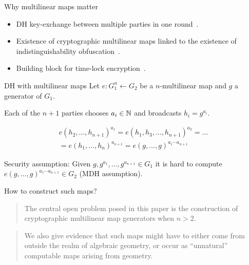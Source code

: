 \documentclass[english]{beamer}
\begin{document}
    \begin{frame}{Why multilinear maps matter}
        \begin{itemize}
            \item DH key-exchange between multiple parties in one round~\cite*{boneh2003applications}.
            \item Existence of cryptographic multilinear maps linked to the existence of indistinguishability obfuscation~\cite*{albrecht2020multilinear}.
            \item Building block for time-lock encryption~\cite*{liu2018build}.
        \end{itemize}
    \end{frame}
    \begin{frame}{DH with multilinear maps}
        Let $e: G_1^n \leftarrow G_2$ be a $n$-multilinear map and $g$ a generator of $G_1$.

        Each of the $n+1$ parties chooses $a_i \in \mathbb{N}$ and broadcasts $h_i = g^{a_i}$.

        \begin{multline*}
            e(h_2, \dots, h_{n+1})^{a_1} = e(h_1, h_3, \dots, h_{n+1})^{a_2} = \dots \\
            = e(h_1, \dots, h_n)^{a_{n+1}} = e(g, \dots, g)^{a_1 \cdots a_{n+1}}
        \end{multline*}

        \pause
        Security assumption: Given $g, g^{a_1}, \dots, g^{a_{n+1}} \in G_1$ it is hard to compute $e(g, \dots, g)^{a_1 \cdots a_{n+1}} \in G_2$ (MDH assumption).
    \end{frame}
    \begin{frame}{How to construct such maps?}
        \blockquote[][]{The central open problem posed in this paper is the construction of cryptographic multilinear map generators when $n > 2$.}
        \pause

        \blockquote[][]{We also give evidence that such maps might have to either come from outside the realm of algebraic geometry, or occur as \enquote{unnatural} computable maps arising from geometry.}
    \end{frame}
\end{document}
